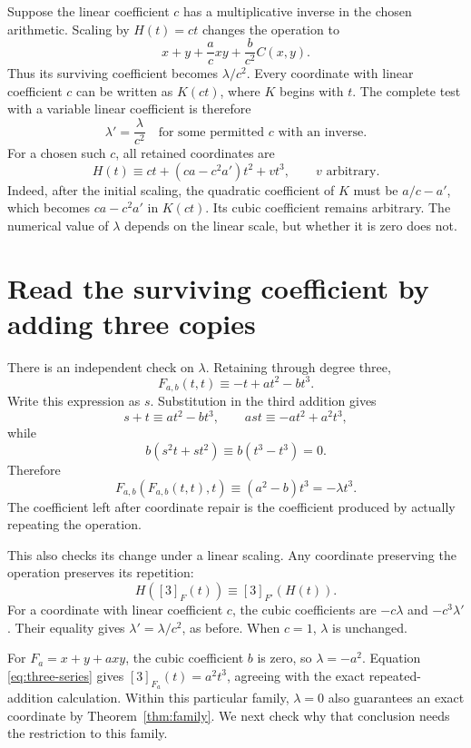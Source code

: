 \documentclass[11pt,letterpaper]{article}
\numberwithin{equation}{section}
\theoremstyle{definition}\newtheorem{example}[theorem]{Example}
\begin{document}
Suppose the linear coefficient \(c\) has a multiplicative inverse in the chosen arithmetic. Scaling by \(H(t)=ct\) changes the operation to
\[
 x+y+\frac acxy+\frac b{c^2}C(x,y).
\]
Thus its surviving coefficient becomes \(\lambda/c^2\). Every coordinate with linear coefficient \(c\) can be written as \(K(ct)\), where \(K\) begins with \(t\). The complete test with a variable linear coefficient is therefore
\begin{equation}\label{eq:nonstrict}
 \lambda'=\frac{\lambda}{c^2}
 \quad\text{for some permitted }c\text{ with an inverse}.
\end{equation}
For a chosen such \(c\), all retained coordinates are
\[
 H(t)\equiv ct+(ca-c^2a')t^2+vt^3,
 \qquad v\text{ arbitrary}.
\]
Indeed, after the initial scaling, the quadratic coefficient of \(K\) must be \(a/c-a'\), which becomes \(ca-c^2a'\) in \(K(ct)\). Its cubic coefficient remains arbitrary. The numerical value of \(\lambda\) depends on the linear scale, but whether it is zero does not.

\section{Read the surviving coefficient by adding three copies}\label{sec:three-series}

There is an independent check on \(\lambda\). Retaining through degree three,
\[
 F_{a,b}(t,t)\equiv-t+at^2-bt^3.
\]
Write this expression as \(s\). Substitution in the third addition gives
\[
 s+t\equiv at^2-bt^3,\qquad
 a st\equiv-at^2+a^2t^3,
\]
while
\[
 b(s^2t+st^2)\equiv b(t^3-t^3)=0.
\]
Therefore
\begin{equation}\label{eq:three-series}
 \boxed{\;F_{a,b}(F_{a,b}(t,t),t)
 \equiv(a^2-b)t^3=-\lambda t^3.\;}
\end{equation}
The coefficient left after coordinate repair is the coefficient produced by actually repeating the operation.

This also checks its change under a linear scaling. Any coordinate preserving the operation preserves its repetition:
\[
 H([3]_F(t))\equiv[3]_{F'}(H(t)).
\]
For a coordinate with linear coefficient \(c\), the cubic coefficients are \(-c\lambda\) and \(-c^3\lambda'\). Their equality gives \(\lambda'=\lambda/c^2\), as before. When \(c=1\), \(\lambda\) is unchanged.

For \(F_a=x+y+a xy\), the cubic coefficient \(b\) is zero, so \(\lambda=-a^2\). Equation \eqref{eq:three-series} gives \([3]_{F_a}(t)=a^2t^3\), agreeing with the exact repeated-addition calculation. Within this particular family, \(\lambda=0\) also guarantees an exact coordinate by Theorem~\ref{thm:family}. We next check why that conclusion needs the restriction to this family.
\end{document}
